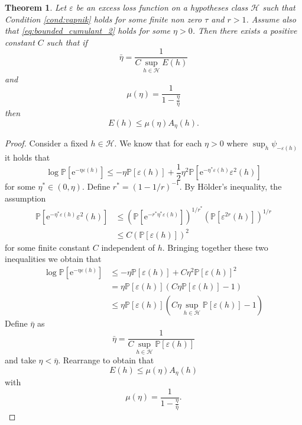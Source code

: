 \documentclass{uvamath}
\newcommand*{\calH}{\mathcal{H}}
\newcommand*{\bbP}{\mathbb{P}}
\newcommand*{\paren}[1]{\left(#1\right)}
\newcommand*{\rme}{\mathrm{e}}
\newtheorem{theorem}{Theorem}[section]
\theoremstyle{remark}
\theoremstyle{definition}
\theoremstyle{definition}
\theoremstyle{definition}
\theoremstyle{definition}
\theoremstyle{definition}
\begin{document}
\begin{theorem}\label{thm:tighter_bound}
  Let $\varepsilon$ be an excess loss function on a hypotheses class
  $\calH$ such that Condition \ref{cond:vapnik} holds for some finite
  non zero $\tau$ and $r > 1$. Assume also that
  \eqref{eq:bounded_cumulant_2} holds for some $\eta>0$. Then there
  exists a positive constant $C$ such that if
  \begin{equation*}
    \bar{\eta} = \frac{1}{C\sup_{h\in\calH}E(h)}
  \end{equation*}
  and
  \begin{equation*}
    \mu(\eta) = \frac{1}{1-\frac{\eta}{\bar{\eta}}}
  \end{equation*}
  then
  \begin{equation*}
    E(h) \leq \mu(\eta)A_{\eta}(h).
  \end{equation*}
\end{theorem}
\begin{proof}
  Consider a fixed $h\in\calH$. We know that for each $\eta>0$ where
  $\sup_{h}\psi_{-\varepsilon(h)}$ it holds that
  \begin{equation*}
    \log\bbP[\rme^{-\eta\varepsilon(h)}] \leq -\eta
    \bbP[\varepsilon(h)] + \frac{1}{2}\eta^2\bbP[\rme^{-\eta^*\varepsilon(h)}\varepsilon^2(h)]
  \end{equation*}
  for some $\eta^*\in(0,\eta)$. Define $r^* = (1-1/r)^{-1}$. By
  Hölder's inequality, the assumption
  \begin{align*}
    \bbP[\rme^{-\eta^*\varepsilon(h)}\varepsilon^2(h)]
    &\leq
      \paren{\bbP[\rme^{-r^*\eta^*\varepsilon(h)}]}^{1/r^*} \paren{\bbP[\varepsilon^{2r}(h)]}^{1/r}\\
    &\leq C \paren{\bbP[\varepsilon(h)]}^{2}
  \end{align*}
  for some finite constant $C$ independent of $h$. Bringing together
  these two inequalities we obtain that
  \begin{align}
    \log\bbP[\rme^{-\eta\varepsilon(h)}]
    &\leq -\eta\bbP[\varepsilon(h)]
      + C\eta^2\bbP[\varepsilon(h)]^2\nonumber\\
    & = \eta\bbP[\varepsilon(h)](C\eta\bbP[\varepsilon(h)] - 1)\nonumber\\
    & \leq \eta\bbP[\varepsilon(h)](C\eta\sup_{h\in\calH}\bbP[\varepsilon(h)] - 1)\label{eq:vapnik_then_central}
  \end{align}
  Define $\bar{\eta}$ as
  \begin{equation*}
    \bar{\eta} = \frac{1}{C\sup_{h\in\calH}\bbP[\varepsilon(h)]}
  \end{equation*}
  and take $\eta<\bar{\eta}$. Rearrange to obtain that
  \begin{equation*}
    E(h)\leq \mu(\eta)A_{\eta}(h)
  \end{equation*}
  with
  \begin{equation*}
    \mu(\eta) = \frac{1}{1-\frac{\eta}{\bar{\eta}}}.
  \end{equation*}
\end{proof}
\end{document}
